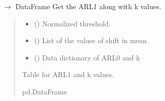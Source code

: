 \documentclass[letterpaper,10pt,oneside,english]{sphinxmanual}
\begin{document}
\begin{fulllineitems}
\label{\detokenize{ref_theoretical:package.ARLTheoretical.get_ARL_1}}
\pysigstartsignatures
\pysiglinewithargsret
{}
{\sphinxparamcomma {}\sphinxparamcomma {}}
{{ $\rightarrow$ DataFrame}}
\pysigstopsignatures
\sphinxAtStartPar
Get the ARL1 along with k values.
\begin{quote}\begin{description}
\begin{itemize}
\item {} 
\sphinxAtStartPar
{} () \textendash{} Normalized threshold.

\item {} 
\sphinxAtStartPar
{} (\sphinxstyleliteralemphasis{\sphinxupquote{{[}}}\sphinxstyleliteralemphasis{\sphinxupquote{{]}}}) \textendash{} List of the values of shift in mean.

\item {} 
\sphinxAtStartPar
{} () \textendash{} Data dictionary of ARL0 and k

\end{itemize}

\sphinxAtStartPar
Table for ARL1 and k values.

\sphinxAtStartPar
pd.DataFrame

\end{description}\end{quote}

\end{fulllineitems}

\end{document}
